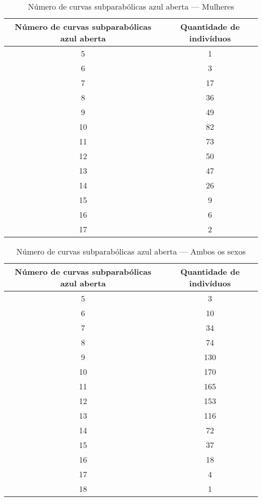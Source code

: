 \documentclass[a4paper,12pt]{article}
\begin{document}
\begin{table}[h!]
\centering
\caption{Número de curvas subparabólicas azul aberta — Mulheres}
\begin{tabular}{c c}
\hline
\textbf{Número de curvas subparabólicas azul aberta} & \textbf{Quantidade de indivíduos} \\ 
\hline
5  & 1  \\
6  & 3  \\
7  & 17 \\
8  & 36 \\
9  & 49 \\
10 & 82 \\
11 & 73 \\
12 & 50 \\
13 & 47 \\
14 & 26 \\
15 & 9  \\
16 & 6  \\
17 & 2  \\
\hline
\end{tabular}
\end{table}


\begin{table}[h!]
\centering
\caption{Número de curvas subparabólicas azul aberta — Ambos os sexos}
\begin{tabular}{c c}
\hline
\textbf{Número de curvas subparabólicas azul aberta} & \textbf{Quantidade de indivíduos} \\ 
\hline
5  & 3  \\
6  & 10 \\
7  & 34 \\
8  & 74 \\
9  & 130 \\
10 & 170 \\
11 & 165 \\
12 & 153 \\
13 & 116 \\
14 & 72 \\
15 & 37 \\
16 & 18 \\
17 & 4  \\
18 & 1  \\
\hline
\end{tabular}
\end{table}
\end{document}
